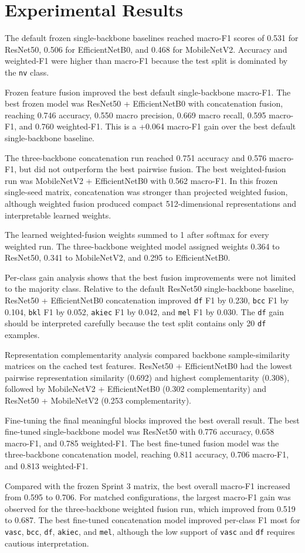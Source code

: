 \section{Experimental Results}

The default frozen single-backbone baselines reached macro-F1 scores of 0.531 for ResNet50, 0.506 for EfficientNetB0, and 0.468 for MobileNetV2. Accuracy and weighted-F1 were higher than macro-F1 because the test split is dominated by the \texttt{nv} class.

Frozen feature fusion improved the best default single-backbone macro-F1. The best frozen model was ResNet50 + EfficientNetB0 with concatenation fusion, reaching 0.746 accuracy, 0.550 macro precision, 0.669 macro recall, 0.595 macro-F1, and 0.760 weighted-F1. This is a +0.064 macro-F1 gain over the best default single-backbone baseline.

The three-backbone concatenation run reached 0.751 accuracy and 0.576 macro-F1, but did not outperform the best pairwise fusion. The best weighted-fusion run was MobileNetV2 + EfficientNetB0 with 0.562 macro-F1. In this frozen single-seed matrix, concatenation was stronger than projected weighted fusion, although weighted fusion produced compact 512-dimensional representations and interpretable learned weights.

The learned weighted-fusion weights summed to 1 after softmax for every weighted run. The three-backbone weighted model assigned weights 0.364 to ResNet50, 0.341 to MobileNetV2, and 0.295 to EfficientNetB0.

Per-class gain analysis shows that the best fusion improvements were not limited to the majority class. Relative to the default ResNet50 single-backbone baseline, ResNet50 + EfficientNetB0 concatenation improved \texttt{df} F1 by 0.230, \texttt{bcc} F1 by 0.104, \texttt{bkl} F1 by 0.052, \texttt{akiec} F1 by 0.042, and \texttt{mel} F1 by 0.030. The \texttt{df} gain should be interpreted carefully because the test split contains only 20 \texttt{df} examples.

Representation complementarity analysis compared backbone sample-similarity matrices on the cached test features. ResNet50 + EfficientNetB0 had the lowest pairwise representation similarity (0.692) and highest complementarity (0.308), followed by MobileNetV2 + EfficientNetB0 (0.302 complementarity) and ResNet50 + MobileNetV2 (0.253 complementarity).

Fine-tuning the final meaningful blocks improved the best overall result. The best fine-tuned
single-backbone model was ResNet50 with 0.776 accuracy, 0.658 macro-F1, and 0.785 weighted-F1. The
best fine-tuned fusion model was the three-backbone concatenation model, reaching 0.811 accuracy,
0.706 macro-F1, and 0.813 weighted-F1.

Compared with the frozen Sprint 3 matrix, the best overall macro-F1 increased from 0.595 to 0.706.
For matched configurations, the largest macro-F1 gain was observed for the three-backbone weighted
fusion run, which improved from 0.519 to 0.687. The best fine-tuned concatenation model improved
per-class F1 most for \texttt{vasc}, \texttt{bcc}, \texttt{df}, \texttt{akiec}, and \texttt{mel},
although the low support of \texttt{vasc} and \texttt{df} requires cautious interpretation.
